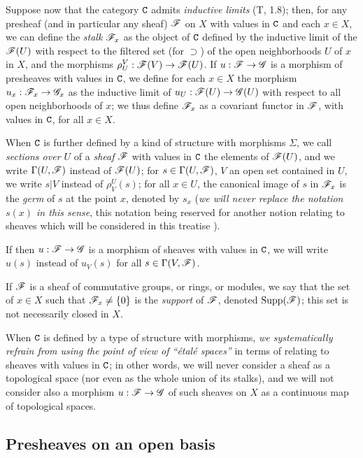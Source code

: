 \begin{env}[3.1.6]
\label{0.3.1.6}
Suppose now that the category $\mathtt{C}$ admits \emph{inductive limits} (T, 1.8);
then, for any presheaf (and in particular any sheaf) $\mathscr{F}$ on $X$ with values
in $\mathtt{C}$ and each $x\in X$, we can define the \emph{stalk} $\mathscr{F}_x$ as the
object of $\mathtt{C}$ defined by the inductive limit of the $\mathscr{F}(U)$ with respect to
the filtered set (for $\supset$) of the open neighborhoods $U$ of $x$ in $X$,
and the morphisms $\rho_U^V:\sh{F}(V)\to\sh{F}(U)$. If $u:\sh{F}\to\sh{G}$ is a
morphism of presheaves with values in $\mathtt{C}$, we define for each $x\in X$ the
morphism $u_x:\sh{F}_x\to\sh{G}_x$ as the inductive limit of
$u_U:\sh{F}(U)\to\sh{G}(U)$ with respect to all open neighborhoods of $x$; we
thus define $\mathscr{F}_x$ as a covariant functor in $\mathscr{F}$, with values in $\mathtt{C}$,
for all $x\in X$.

When $\mathtt{C}$ is further defined by a kind of structure with morphisms $\Sigma$, we
call \emph{sections over $U$} of a \emph{sheaf} $\mathscr{F}$ with values in $\mathtt{C}$ the
elements of $\mathscr{F}(U)$, and we write $\Gamma(U,\mathscr{F})$ instead of $\mathscr{F}(U)$;
for $s\in\Gamma(U,\mathscr{F})$, $V$ an open set contained in $U$, we write $s|V$
instead of $\rho_V^U(s)$; for all $x\in U$, the canonical image of $s$ in
$\mathscr{F}_x$ is the \emph{germ} of $s$ at the point $x$, denoted by $s_x$
(\emph{we will never replace the notation $s(x)$ in this sense}, this notation
being reserved for another notion relating to sheaves which will be considered
in this treatise ).

If then $u:\sh{F}\to\sh{G}$ is a morphism of sheaves with values in $\mathtt{C}$, we
will write $u(s)$ instead of $u_V(s)$ for all $s\in\Gamma(V,\mathscr{F})$.

If $\mathscr{F}$ is a sheaf of commutative groups, or rings, or modules, we say that
the set of $x\in X$ such that $\mathscr{F}_x\neq\{0\}$ is the \emph{support} of
$\mathscr{F}$, denoted ${\mathop{\mathrm{Supp}}\nolimits}(\mathscr{F})$; this set is not necessarily closed in $X$.

When $\mathtt{C}$ is defined by a type of structure with morphisms, \emph{we
systematically refrain from using the point of view of ``\'etal\'e spaces''} in
terms of relating to sheaves with values in $\mathtt{C}$; in other words, we will never
consider a sheaf as a topological space (nor even as the whole union of its
stalks), and we will not consider also a morphism $u:\sh{F}\to\sh{G}$ of such
sheaves on $X$ as a continuous map of topological spaces.
\end{env}

\subsection{Presheaves on an open basis}
\label{subsection:0.3.2}

